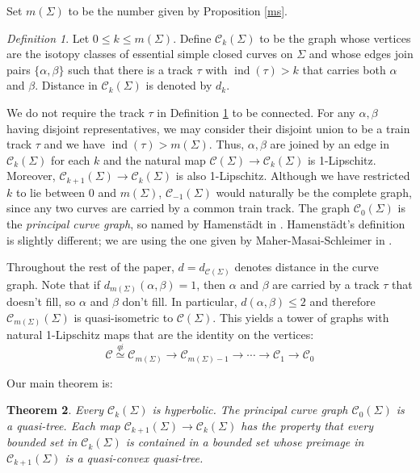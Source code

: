 \documentclass[11pt]{article}
\newtheorem{thm}{Theorem}[section]
\theoremstyle{remark}
\newtheorem{definition}[thm]{Definition}
\def\C{{\mathcal C}}
\def\ind{\operatorname{ind}}
\begin{document}
Set $m(\Sigma)$ to be the number given by Proposition \ref{ms}.


\begin{definition}
  \label{ckdefn}
  Let $0\leq k \leq m(\Sigma)$. Define $\C_k(\Sigma)$ to be the graph whose
  vertices are the isotopy classes of essential simple closed curves on $\Sigma$
  and whose edges join pairs $\{\alpha,\beta\}$ such that there is a track $\tau$
  with $\ind(\tau) >k$ that carries both $\alpha$ and $\beta$. Distance in $\C_k(\Sigma)$ is denoted by $d_k$.
\end{definition}

We do not require the track $\tau$ in Definition \ref{ckdefn} to be connected.
For any $\alpha,\beta$ having disjoint representatives, we may consider
their disjoint union to be a train track $\tau$ and we have $\ind(\tau) > m(\Sigma)$.
Thus, $\alpha,\beta$ are joined by an edge in $\C_k(\Sigma)$ for each $k$ and the
natural map $\C(\Sigma) \to \C_k(\Sigma)$ is 1-Lipschitz. Moreover,
$\C_{k+1}(\Sigma)\to \C_k(\Sigma)$ is also 1-Lipschitz.
Although we have restricted $k$ to lie between 0 and $m(\Sigma)$,
$\C_{-1}(\Sigma)$ would naturally be the complete graph, since any two
curves are carried by a common train track. The graph $\C_0(\Sigma)$ is the
\emph{principal curve graph}, so named by Hamenst\"adt in
\cite{HamenstadtPrincipal}.
Hamenst\"adt's definition is slightly
different; we are using the one given by Maher-Masai-Schleimer
in \cite{MMS2}.

Throughout the rest of the paper, $d=d_{\C(\Sigma)}$ denotes distance in the
curve graph.
Note that if $d_{m(\Sigma)}(\alpha, \beta) = 1$, then $\alpha$ and $\beta$ are carried by a track $\tau$ that doesn't fill, so $\alpha$ and $\beta$ don't fill. In particular, $d(\alpha, \beta) \le 2$ and therefore
$\C_{m(\Sigma)}(\Sigma)$ is quasi-isometric to
$\C(\Sigma)$. This yields a tower of graphs with natural 1-Lipschitz maps
that are the identity on the vertices:
$$\C\overset{qi}{\simeq}\C_{m(\Sigma)}\to \mathcal
  C_{m(\Sigma)-1}\to\cdots\to \C_{1}\to \mathcal
  C_{0}$$

Our main theorem is:

\begin{thm}
  \label{mainthm}
  Every $\C_{k}(\Sigma)$ is hyperbolic. The principal curve graph
  $\C_{0}(\Sigma)$ is a quasi-tree. Each map $\mathcal
    C_{k+1}(\Sigma)\to\C_k(\Sigma)$ has the property that every bounded set in
  $\C_k(\Sigma)$ is contained in a bounded set whose preimage in $\C_{k+1}(\Sigma)$ is
  a quasi-convex quasi-tree.
\end{thm}
\end{document}
